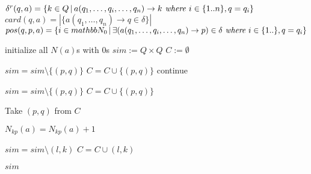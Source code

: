
	 {
		 {
			$\delta^r(q,a) = \{k \in Q\,|\, a(q_1,\ldots, q_i, \ldots, q_n) \rightarrow k \emph{ where } i \in \{1..n\}, q = q_i \}$\;
			$card(q,a) = |\{a(q_1, \ldots, q_n) \rightarrow q \in \delta\}|$\;
			{
				$pos(q,p,a) = \{i\in mathbb{N}_0 \,|\, \exists (a(q_1, \ldots, q_i, \ldots, q_n) \rightarrow p) \in \delta \emph{ where } i \in \{1..\}, q=q_i\}$
			}
		}
	}
	

	initialize all $N(a)$s with $0$s\;
	$sim := Q\times Q$\;
	$C := \emptyset$\;

	 {
		 {
			{
				$sim = sim \setminus \{(p,q)\}$\;
				$C = C \cup \{(p,q)\}$\;
				continue\;
			}

			{
				$sim = sim \setminus \{(p,q)\}$\;
				$C = C \cup \{(p,q)\}$\;
			}
		}
	}
	
	{
		Take $(p,q)$ from $C$\;
		{
			{
				{
					$N_{kp}(a) = N_{kp}(a) + 1$\;
				}

				{
					{
						{
							$sim = sim \setminus {(l,k)}$\;
							$C = C \cup {(l,k)}$\;
						}
					}
				}
			}
		}

	}
	\Return $sim$\;
